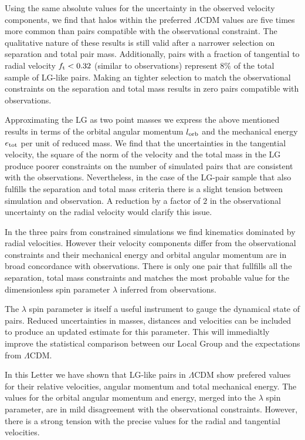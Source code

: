 \documentclass{emulateapj}
\begin{document}
Using the same absolute values for the uncertainty in the observed
velocity components, we find that halos within the preferred
$\Lambda$CDM values are five times more common than pairs compatible
with the observational constraint.  The qualitative nature of these
results is still valid after a narrower selection on separation and
total pair mass. Additionally, pairs with a fraction of tangential to
radial velocity $f_{\rm t}<0.32$ (similar to observations) represent
$8\%$ of the total sample of LG-like pairs. Making an tighter
selection to match the observational constraints on the separation and
total mass results in zero pairs compatible with observations. 

Approximating the LG as two point masses we express the above
mentioned results in terms of the orbital angular momentum $l_{\rm
  orb}$ and the mechanical energy $e_{\rm tot}$ per unit of reduced
mass. We find that the uncertainties in the tangential velocity, the
square of the norm of the velocity and the total mass in the LG
produce poorer constraints on the number of simulated pairs that are
consistent with the observations. Nevertheless, in the case of the
LG-pair sample that also fulfills the separation and total mass
criteria there is a slight tension between simulation and
observation. A reduction by a factor of $2$ in the observational
uncertainty on the radial velocity would clarify this issue. 

In the three pairs from constrained simulations we find kinematics
dominated by radial velocities. However their velocity components
differ from the observational constraints and their mechanical energy
and orbital angular momentum are in broad concordance with
observations. There is only one pair that fullfills all the
separation, total mass constraints and matches the most probable value
for the dimensionless spin parameter $\lambda$ inferred from
observations.  

The $\lambda$ spin parameter is itself a useful instrument to gauge
the dynamical state of pairs. Reduced uncertainties in masses,
distances and velocities can be included to produce an updated
estimate for this parameter. This will immedialtly improve the
statistical comparison between our Local Group and the expectations
from $\Lambda$CDM. 

In this Letter we have shown that LG-like pairs in $\Lambda$CDM show
prefered values for their relative velocities, angular momentum and
total mechanical energy. The values for the orbital angular momentum
and energy, merged into the $\lambda$ spin parameter, are in mild
disagreement with the observational constraints. However, there is a
strong tension with the precise values for the radial and tangential
velocities. 
\end{document}
